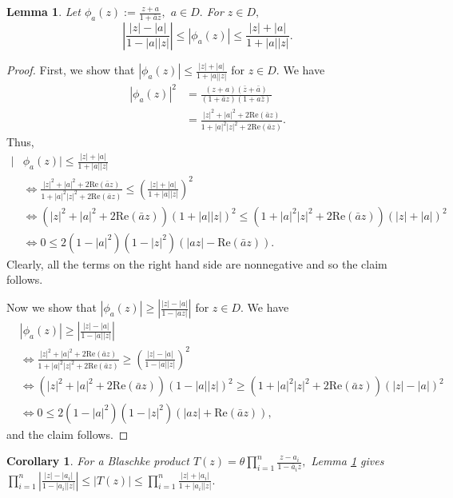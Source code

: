 \documentclass[12pt,reqno]{amsart}
\numberwithin{theorem}{section}
\newtheorem{lemma}[theorem]{Lemma}
\newtheorem{corollary}[theorem]{Corollary}
\begin{document}
\begin{lemma}\label{Möbius bound}
     Let $\phi_{a}(z):=\frac{z+a}{1+\bar{a}z},$ $a\in D.$ For $z\in D,$ $$\left|\frac{|z|-|a|}{1-|a||z|}\right|\le|\phi_{a}(z)|\le\frac{|z|+|a|}{1+|a||z|}.$$
\end{lemma}
\begin{proof}
        First, we show that $|\phi_{a}(z)|\le\frac{|z|+|a|}{1+|a||z|}$ for $z\in D.$ We have
    \begin{align*}
        |\phi_a(z)|^2&=\frac{(z+a)(\bar{z}+\bar{a})}{(1+\bar{a}z)(1+a\bar{z})}\\&=\frac{|z|^2+|a|^2+2\text{Re}(\bar{a}z)}{1+|a|^2|z|^2+2\text{Re}(\bar{a}z)}.
    \end{align*} Thus, \begin{align*}|&\phi_a(z)|\le\frac{|z|+|a|}{1+|a||z|}\\&\iff \frac{|z|^2+|a|^2+2\text{Re}(\bar{a}z)}{1+|a|^2|z|^2+2\text{Re}(\bar{a}z)}\le\left(\frac{|z|+|a|}{1+|a||z|}\right)^2\\&\iff(|z|^2+|a|^2+2\text{Re}(\bar{a}z))(1+|a||z|)^2\le(1+|a|^2|z|^2+2 \text{Re}(\bar{a}z))(|z|+|a|)^2\\&\iff 0\le 2(1-|a|^2)(1-|z|^2)(|az|-\text{Re}(\bar{a}z)).\end{align*} Clearly, all the terms on the right hand side are nonnegative and so the claim follows.

    Now we show that $|\phi_a(z)|\ge\left|\frac{|z|-|a|}{1-|az|}\right|$ for $z\in D.$ We have
    \begin{align*}
        &|\phi_a(z)|\ge\left|\frac{|z|-|a|}{1-|a||z|}\right|\\&\iff \frac{|z|^2+|a|^2+2\text{Re}(\bar{a}z)}{1+|a|^2|z|^2+2\text{Re}(\bar{a}z)}\ge\left(\frac{|z|-|a|}{1-|a||z|}\right)^2\\&\iff(|z|^2+|a|^2+2\text{Re}(\bar{a}z))(1-|a||z|)^2\ge(1+|a|^2|z|^2+2 \text{Re}(\bar{a}z))(|z|-|a|)^2\\&\iff 0\le 2(1-|a|^2)(1-|z|^2)(|az|+\text{Re}(\bar{a}z)),
    \end{align*} and the claim follows.
\end{proof}
\begin{corollary}\label{Blaschke_bound}
    For a Blaschke product $T(z)=\theta\prod_{i=1}^{n}\frac{z-a_{i}}{1-\bar{a}_iz},$ Lemma \ref{Möbius bound} gives $\prod_{i=1}^{n}\left|\frac{|z|-|a_i|}{1-|a_i||z|}\right|\le|T(z)|\le\prod_{i=1}^{n}\frac{|z|+|a_i|}{1+|a_i||z|}.$
\end{corollary}
\end{document}

